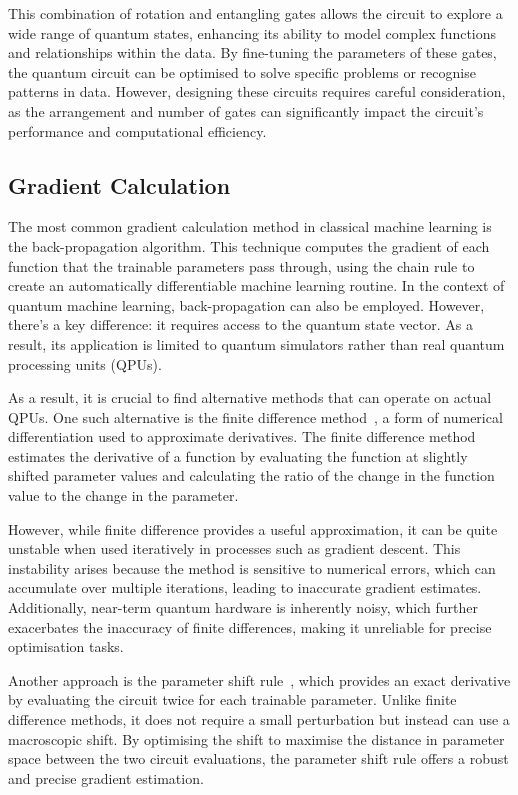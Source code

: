 This combination of rotation and entangling gates allows the circuit
to explore a wide range of quantum states, enhancing its ability to
model complex functions and relationships within the data. By
fine-tuning the parameters of these gates, the quantum circuit can be
optimised to solve specific problems or recognise patterns in data.
However, designing these circuits requires careful consideration, as
the arrangement and number of gates can significantly impact the
circuit's performance and computational efficiency.

\subsection{Gradient Calculation}
\label{subsec:gradient_calculation}
The most common gradient calculation method in classical machine
learning is the back-propagation algorithm. This technique computes
the gradient of each function that the trainable parameters pass
through, using the chain rule to create an automatically
differentiable machine learning routine. In the context of quantum
machine learning, back-propagation can also be employed. However,
there’s a key difference: it requires access to the quantum state
vector. As a result, its application is limited to quantum simulators
rather than real quantum processing units (QPUs).

As a result, it is crucial to find alternative methods that can
operate on actual QPUs. One such alternative is the finite difference
method~\cite{Schuld_2019}, a form of numerical differentiation used
to approximate derivatives. The finite difference method estimates
the derivative of a function by evaluating the function at slightly
shifted parameter values and calculating the ratio of the change in
the function value to the change in the parameter.

However, while finite difference provides a useful approximation, it
can be quite unstable when used iteratively in processes such as
gradient descent. This instability arises because the method is
sensitive to numerical errors, which can accumulate over multiple
iterations, leading to inaccurate gradient estimates. Additionally,
near-term quantum hardware is inherently noisy, which further
exacerbates the inaccuracy of finite differences, making it
unreliable for precise optimisation tasks.

Another approach is the parameter shift rule~\cite{Schuld_2019},
which provides an exact derivative by evaluating the circuit twice
for each trainable parameter. Unlike finite difference methods, it
does not require a small perturbation but instead can use a
macroscopic shift. By optimising the shift to maximise the distance
in parameter space between the two circuit evaluations, the parameter
shift rule offers a robust and precise gradient estimation.

